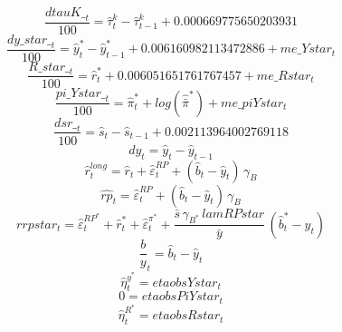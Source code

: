 \begin{dmath}
\frac{{dtauK\__{t}}}{100}={\hat{\tau}^k_{t}}-{\hat{\tau}^k_{t-1}}+0.000669775650203931
\end{dmath}
\begin{dmath}
\frac{{dy\_star\__{t}}}{100}={\hat{y}^*_{t}}-{\hat{y}^*_{t-1}}+0.006160982113472886+{me\_Ystar_{t}}
\end{dmath}
\begin{dmath}
\frac{{R\_star\__{t}}}{100}={\hat{r}^*_{t}}+0.006051651761767457+{me\_Rstar_{t}}
\end{dmath}
\begin{dmath}
\frac{{pi\_Ystar\__{t}}}{100}={\hat{\pi}^*_{t}}+log\left({\hat{\bar{\pi}}^*}\right)+{me\_piYstar_{t}}
\end{dmath}
\begin{dmath}
\frac{{dsr\__{t}}}{100}={\hat{s}_{t}}-{\hat{s}_{t-1}}+0.002113964002769118
\end{dmath}
\begin{dmath}
{dy_{t}}={\hat{y}_{t}}-{\hat{y}_{t-1}}
\end{dmath}
\begin{dmath}
{\hat{r}^{long}_{t}}={\hat{r}_{t}}+{\hat{\varepsilon}^{RP}_{t}}+\left({\hat{b}_{t}}-{\hat{y}_{t}}\right)\, {\gamma_{B}}
\end{dmath}
\begin{dmath}
{\hat{rp}_{t}}={\hat{\varepsilon}^{RP}_{t}}+\left({\hat{b}_{t}}-{\hat{y}_{t}}\right)\, {\gamma_{B}}
\end{dmath}
\begin{dmath}
{rrpstar_{t}}={\hat{\varepsilon}^{RP^*}_{t}}+{\hat{r}^*_{t}}+{\hat{\varepsilon}^{\pi^*}_{t}}+\frac{{\bar{s}}\, {\gamma_{B^*}}\, {lamRPstar}}{{\bar{y}}}\, \left({\hat{b}^*_{t}}-{\hat{y}_{t}}\right)
\end{dmath}
\begin{dmath}
{\frac{b}{y}_{t}}={\hat{b}_{t}}-{\hat{y}_{t}}
\end{dmath}
\begin{dmath}
{\hat{\eta}^{y^*}_{t}}={etaobsYstar_{t}}
\end{dmath}
\begin{dmath}
0={etaobsPiYstar_{t}}
\end{dmath}
\begin{dmath}
{\hat{\eta}^{R^*}_{t}}={etaobsRstar_{t}}
\end{dmath}
